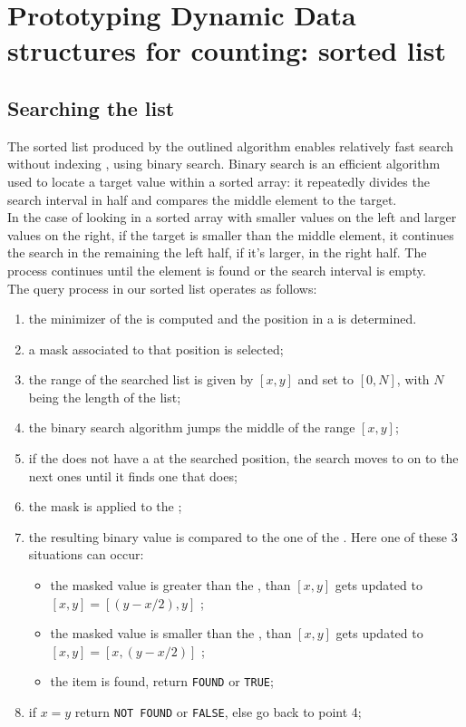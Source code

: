 \section*{Prototyping Dynamic Data structures for \kmer counting: \skmer sorted list}
\label{skmer_appendix}
\subsection*{Searching the list}
The sorted \skmer list produced by the outlined algorithm enables relatively fast search without indexing \kmers, using binary search. Binary search is an efficient algorithm used to locate a target value within a sorted array: it repeatedly divides the search interval in half and compares the middle element to the target.\\
In the case of looking in a sorted array with smaller values on the left and larger values on the right, if the target is smaller than the middle element, it continues the search in the remaining the left half, if it's larger, in the right half. The process continues until the element is found or the search interval is empty.\\
The \kmer query process in our sorted \skmer list operates as follows:
\begin{enumerate}
	\item the minimizer of the \kmers is computed and the \kmer position in a \skmer is determined.
	\item a mask associated to that position is selected;
	\item the range of the searched list is given by $[x,y]$ and set to $[0,N]$, with $N$ being the length of the list;
	\item the binary search algorithm jumps the middle \skmer of the range $[x,y]$;
	\item if the \skmer does not have a \kmer at the searched position, the search moves to on to the next ones until it finds one that does;
	\item the mask is applied to the \skmer;
	\item the resulting binary value is compared to the one of the \kmer. Here one of these 3 situations can occur:
	\begin{itemize}
		\item the masked \skmer value is greater than the \kmer, than $[x,y]$ gets updated to $[x,y] = [(y-x/2),y]$ ;
		\item the masked \skmer value is smaller than the \kmer, than $[x,y]$ gets updated to $[x,y] = [x,(y-x/2)]$ ;
		\item the item is found, return \texttt{FOUND} or \texttt{TRUE};
	\end{itemize}
	\item if $x = y$ return \texttt{NOT FOUND} or \texttt{FALSE}, else go back to point 4;
\end{enumerate}
